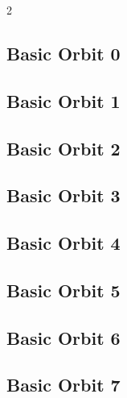 \begin{multicols}{2}
\subsection*{Basic Orbit 0}



\bigskip

\subsection*{Basic Orbit 1}



\bigskip

\subsection*{Basic Orbit 2}



\bigskip

\subsection*{Basic Orbit 3}



\bigskip

\subsection*{Basic Orbit 4}



\bigskip

\subsection*{Basic Orbit 5}



\bigskip

\subsection*{Basic Orbit 6}



\bigskip

\subsection*{Basic Orbit 7}


\end{multicols}
